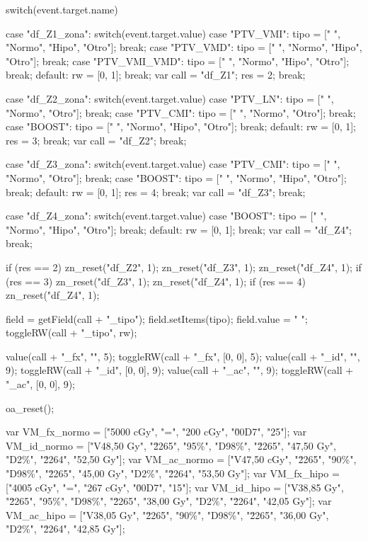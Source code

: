 		switch(event.target.name){
			case "df_Z1_zona":  
				switch(event.target.value){
					case "PTV_VMI":     tipo = [" ", "Normo", "Hipo", "Otro"]; break;
					case "PTV_VMD":     tipo = [" ", "Normo", "Hipo", "Otro"]; break;
					case "PTV_VMI_VMD": tipo = [" ", "Normo", "Hipo", "Otro"]; break;
					default: rw = [0, 1]; break;
				}
				var call = "df_Z1"; res = 2; break;

			case "df_Z2_zona":  
				switch(event.target.value){
					case "PTV_LN":  tipo = [" ", "Normo", "Otro"]; 				 break;
					case "PTV_CMI": tipo = [" ", "Normo", "Otro"]; 				 break;
					case "BOOST":   tipo = [" ", "Normo", "Hipo", "Otro"]; break;
					default: rw = [0, 1]; res = 3; break;
				}
				var call = "df_Z2"; break;

			case "df_Z3_zona":  
				switch(event.target.value){
					case "PTV_CMI": tipo = [" ", "Normo", "Otro"];         break;
					case "BOOST":   tipo = [" ", "Normo", "Hipo", "Otro"]; break;
					default: rw = [0, 1]; res = 4; break;
				}
				var call = "df_Z3"; break;

			case "df_Z4_zona":  
				switch(event.target.value){
					case "BOOST": tipo = [" ", "Normo", "Hipo", "Otro"]; break;
					default: rw = [0, 1]; break;
				}
				var call = "df_Z4"; break;
		}


		if (res == 2){ zn_reset("df_Z2", 1); zn_reset("df_Z3", 1); zn_reset("df_Z4", 1);}
		if (res == 3){ zn_reset("df_Z3", 1); zn_reset("df_Z4", 1);} 
		if (res == 4){ zn_reset("df_Z4", 1);}

		field = getField(call + "_tipo"); 
		field.setItems(tipo); field.value = " ";
		toggleRW(call + "_tipo", rw);

		value(call + "_fx", "", 5); toggleRW(call + "_fx", [0, 0], 5);
		value(call + "_id", "", 9); toggleRW(call + "_id", [0, 0], 9);
		value(call + "_ac", "", 9);	toggleRW(call + "_ac", [0, 0], 9);

		oa_reset();
	\stopJScode


		var VM_fx_normo = ["5000 cGy", "=", "200 cGy", "\u00D7", "25"];
		var VM_id_normo = ["V48,50 Gy", "\u2265", "95\%", "D98\%", "\u2265", "47,50 Gy", "D2\%", "\u2264", "52,50 Gy"];
		var VM_ac_normo = ["V47,50 cGy", "\u2265", "90\%", "D98\%", "\u2265", "45,00 Gy", "D2\%", "\u2264", "53,50 Gy"]; 
		var VM_fx_hipo  = ["4005 cGy", "=", "267 cGy", "\u00D7", "15"];
		var VM_id_hipo  = ["V38,85 Gy", "\u2265", "95\%", "D98\%", "\u2265", "38,00 Gy", "D2\%", "\u2264", "42,05 Gy"];
		var VM_ac_hipo  = ["V38,05 Gy", "\u2265", "90\%", "D98\%", "\u2265", "36,00 Gy", "D2\%", "\u2264", "42,85 Gy"]; 

